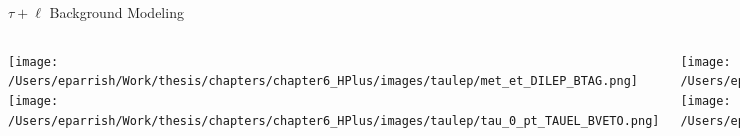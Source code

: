 \documentclass[aspectratio=169,xcolor=table]{beamer}
\begin{document}
    \begin{frame}[t]{$\tau+\ell$ Background Modeling}
      \begin{columns}[t]

        \texttt{[image: /Users/eparrish/Work/thesis/chapters/chapter6\_HPlus/images/taulep/met\_et\_DILEP\_BTAG.png]}
        \texttt{[image: /Users/eparrish/Work/thesis/chapters/chapter6\_HPlus/images/taulep/tau\_0\_pt\_TAUEL\_BVETO.png]}

        \texttt{[image: /Users/eparrish/Work/thesis/chapters/chapter6\_HPlus/images/taulep/lep\_0\_pt\_DILEP\_BTAG.png]}
        \texttt{[image: /Users/eparrish/Work/thesis/chapters/chapter6\_HPlus/images/taulep/lep\_0\_pt\_TAUEL\_BVETO.png]}

        \texttt{[image: /Users/eparrish/Work/thesis/chapters/chapter6\_HPlus/images/taulep/tau\_0\_pt\_SS\_TAUEL.png]}
        \texttt{[image: /Users/eparrish/Work/thesis/chapters/chapter6\_HPlus/images/taulep/tau\_0\_pt\_SS\_TAUMU.png]}


        \texttt{[image: /Users/eparrish/Work/thesis/chapters/chapter6\_HPlus/images/taulep/lep\_0\_pt\_SS\_TAUEL.png]}
        \texttt{[image: /Users/eparrish/Work/thesis/chapters/chapter6\_HPlus/images/taulep/lep\_0\_pt\_SS\_TAUMU.png]}

      \end{columns}
    \end{frame}
\end{document}
